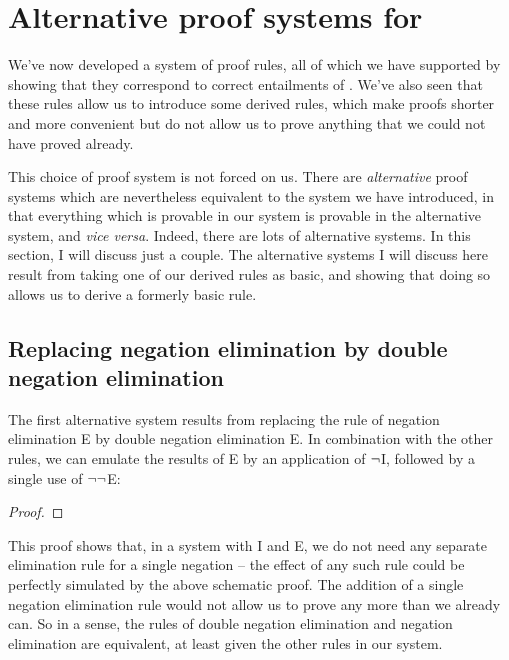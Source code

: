 \chapter{Alternative proof systems for \textnormal{\TFL}}\label{s:alternates}

We've now developed a system of proof rules, all of which we have supported by showing that they correspond to correct entailments of \TFL. We've also seen that these rules allow us to introduce some derived rules, which make proofs shorter and more convenient but do not allow us to prove anything that we could not have proved already.

This choice of proof system is not forced on us. There are \emph{alternative} proof systems which are nevertheless equivalent to the system we have introduced, in that everything which is provable in our system is provable in the alternative system, and \emph{vice versa}. Indeed, there are lots of alternative systems. In this section, I will discuss just a couple. The alternative systems I will discuss here result from taking one of our derived rules as basic, and showing that doing so allows us to derive a formerly basic rule.

\section{Replacing negation elimination by double negation elimination} 

The first alternative system results from replacing the rule of negation elimination {\enot}E by double negation elimination {\enot\enot}E. In combination with the other rules, we can emulate the results of {\enot}E by an application of $\neg$I, followed by a single use of $\neg\neg$E:
 \begin{proof}
	\open 
	\have[\ ]{}{\vdots}
	\have[\ ]{}{\vdots}
	\close
	 
\end{proof}
This proof shows that, in a system with {\enot}I and {\enot\enot}E, we do not need any separate elimination rule for a single negation – the effect of any such rule could be perfectly simulated by the above schematic proof. The addition of a single negation elimination rule would not allow us to prove any more than we already can. So in a sense, the rules of double negation elimination and negation elimination are equivalent, at least given the other rules in our system.

